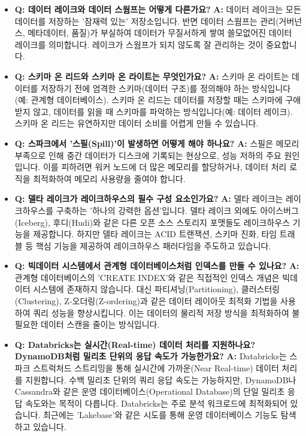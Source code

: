 \documentclass[11pt,a4paper]{article}
\theoremstyle{definition}
\begin{document}
\begin{tcolorbox}[title=\textbf{초심자를 위한 FAQ}, colback=yellow!5!white, colframe=yellow!75!black, sharp corners, boxrule=0.8pt]
\begin{itemize}
    \item \textbf{Q: 데이터 레이크와 데이터 스웜프는 어떻게 다른가요?}
    \textbf{A:} 데이터 레이크는 모든 데이터를 저장하는 '잠재력 있는' 저장소입니다. 반면 데이터 스웜프는 관리(거버넌스, 메타데이터, 품질)가 부실하여 데이터가 무질서하게 쌓여 쓸모없어진 데이터 레이크를 의미합니다. 레이크가 스웜프가 되지 않도록 잘 관리하는 것이 중요합니다.

    \item \textbf{Q: 스키마 온 리드와 스키마 온 라이트는 무엇인가요?}
    \textbf{A:} 스키마 온 라이트는 데이터를 저장하기 전에 엄격한 스키마(데이터 구조)를 정의해야 하는 방식입니다(예: 관계형 데이터베이스). 스키마 온 리드는 데이터를 저장할 때는 스키마에 구애받지 않고, 데이터를 읽을 때 스키마를 파악하는 방식입니다(예: 데이터 레이크). 스키마 온 리드는 유연하지만 데이터 소비를 어렵게 만들 수 있습니다.

    \item \textbf{Q: 스파크에서 '스필(Spill)'이 발생하면 어떻게 해야 하나요?}
    \textbf{A:} 스필은 메모리 부족으로 인해 중간 데이터가 디스크에 기록되는 현상으로, 성능 저하의 주요 원인입니다. 이를 피하려면 워커 노드에 더 많은 메모리를 할당하거나, 데이터 처리 로직을 최적화하여 메모리 사용량을 줄여야 합니다.

    \item \textbf{Q: 델타 레이크가 레이크하우스의 필수 구성 요소인가요?}
    \textbf{A:} 델타 레이크는 레이크하우스를 구축하는 '하나의 강력한 옵션'입니다. 델타 레이크 외에도 아이스버그(Iceberg), 후디(Hudi)와 같은 다른 오픈 소스 스토리지 포맷들도 레이크하우스 기능을 제공합니다. 하지만 델타 레이크는 ACID 트랜잭션, 스키마 진화, 타임 트래블 등 핵심 기능을 제공하여 레이크하우스 패러다임을 주도하고 있습니다.

    \item \textbf{Q: 빅데이터 시스템에서 관계형 데이터베이스처럼 인덱스를 만들 수 있나요?}
    \textbf{A:} 관계형 데이터베이스의 'CREATE INDEX'와 같은 직접적인 인덱스 개념은 빅데이터 시스템에 존재하지 않습니다. 대신 파티셔닝(Partitioning), 클러스터링(Clustering), Z-오더링(Z-ordering)과 같은 데이터 레이아웃 최적화 기법을 사용하여 쿼리 성능을 향상시킵니다. 이는 데이터의 물리적 저장 방식을 최적화하여 불필요한 데이터 스캔을 줄이는 방식입니다.

    \item \textbf{Q: Databricks는 실시간(Real-time) 데이터 처리를 지원하나요? DynamoDB처럼 밀리초 단위의 응답 속도가 가능한가요?}
    \textbf{A:} Databricks는 스파크 스트럭처드 스트리밍을 통해 실시간에 가까운(Near Real-time) 데이터 처리를 지원합니다. 수백 밀리초 단위의 쿼리 응답 속도는 가능하지만, DynamoDB나 Cassandra와 같은 운영 데이터베이스(Operational Database)의 단일 밀리초 응답 속도와는 목적이 다릅니다. Databricks는 주로 분석 워크로드에 최적화되어 있습니다. 최근에는 'Lakebase'와 같은 시도를 통해 운영 데이터베이스 기능도 탐색하고 있습니다.


\end{itemize}
\end{tcolorbox}
\end{document}
